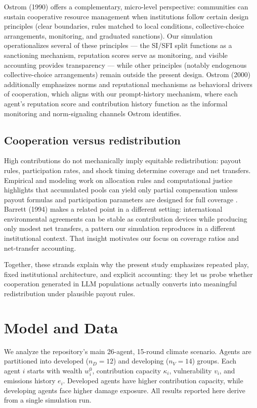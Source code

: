 \documentclass[12pt,letterpaper]{article}
\begin{document}
Ostrom (1990) offers a complementary, micro-level perspective: communities can sustain cooperative resource management when institutions follow certain design principles (clear boundaries, rules matched to local conditions, collective-choice arrangements, monitoring, and graduated sanctions). Our simulation operationalizes several of these principles — the SI/SFI split functions as a sanctioning mechanism, reputation scores serve as monitoring, and visible accounting provides transparency — while other principles (notably endogenous collective-choice arrangements) remain outside the present design. Ostrom (2000) additionally emphasizes norms and reputational mechanisms as behavioral drivers of cooperation, which aligns with our prompt-history mechanism, where each agent's reputation score and contribution history function as the informal monitoring and norm-signaling channels Ostrom identifies.

\subsection*{Cooperation versus redistribution}
High contributions do not mechanically imply equitable redistribution: payout rules, participation rates, and shock timing determine coverage and net transfers. Empirical and modeling work on allocation rules and computational justice highlights that accumulated pools can yield only partial compensation unless payout formulas and participation parameters are designed for full coverage \citep{ospina2025,piatti2024}. Barrett (1994) makes a related point in a different setting: international environmental agreements can be stable as contribution devices while producing only modest net transfers, a pattern our simulation reproduces in a different institutional context. That insight motivates our focus on coverage ratios and net-transfer accounting.

Together, these strands explain why the present study emphasizes repeated play, fixed institutional architecture, and explicit accounting: they let us probe whether cooperation generated in LLM populations actually converts into meaningful redistribution under plausible payout rules.

\section{Model and Data}

We analyze the repository's main 26-agent, 15-round climate scenario. Agents are partitioned into developed ($n_D=12$) and developing ($n_V=14$) groups. Each agent $i$ starts with wealth $w_i^0$, contribution capacity $\kappa_i$, vulnerability $v_i$, and emissions history $e_i$. Developed agents have higher contribution capacity, while developing agents face higher damage exposure.
All results reported here derive from a single simulation run.
\end{document}
